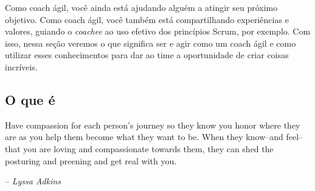 \documentclass{iiufrgs}
\begin{document}
Como coach ágil, você ainda está ajudando alguém a atingir seu próximo objetivo. Como coach ágil, você também está compartilhando experiências e valores, guiando o \textit{coachee} ao uso efetivo dos princípios Scrum, por exemplo. Com isso, nessa seção veremos o que significa ser e agir como um coach ágil e como utilizar esses conhecimentos para dar ao time a oportunidade de criar coisas incríveis.

\subsection{O que é}

\epigraph{Have compassion for each person's journey so they know you honor where they are as you help them become what they want to be. When they know--and feel--that you are loving and compassionate towards them, they can shed the posturing and preening and get real with you.}{-- \textit{Lyssa Adkins}}



 
\end{document}

